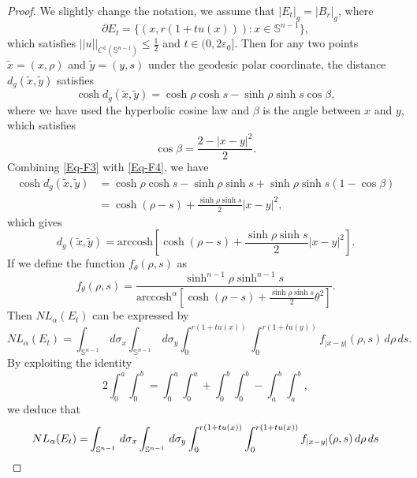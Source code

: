 \documentclass[10pt,a4paper]{amsart}
\begin{document}
\begin{proof}
	We slightly change the notation, we assume that $|E_t|_g=|B_r|_g$, where 
	\begin{equation*}
		\partial E_t=\{(x,r(1+tu(x))):x\in\mathbb{S}^{n-1}\},
\end{equation*}
which satisfies $||u||_{C^1(\mathbb{S}^{n-1})}\leq\frac{1}{2}$ and $t\in(0,2\varepsilon_0]$. Then for any two points $\tilde{x}=(x,\rho)$ and $\tilde{y}=(y,s)$ under the geodesic polar coordinate, the distance $d_g(\tilde{x},\tilde{y})$ satisfies
\begin{equation}\label{Eq-F3}
	\cosh d_g(\tilde{x},\tilde{y})=\cosh\rho\cosh s-\sinh\rho\sinh s\cos\beta,
\end{equation}
where we have used the hyperbolic cosine law and $\beta$ is the angle between $x$ and $y$,
which satisfies
\begin{equation}\label{Eq-F4}
	\cos\beta=\frac{2-|x-y|^2}{2}.
\end{equation}
Combining \eqref{Eq-F3} with \eqref{Eq-F4}, we have
\begin{align*}
	\cosh d_g(\tilde{x},\tilde{y})&=\cosh\rho\cosh s-\sinh\rho\sinh s+\sinh\rho\sinh s(1-\cos\beta)\\
	&=\cosh(\rho-s)+\frac{\sinh\rho\sinh s}{2}|x-y|^2,
\end{align*} 
which gives
\begin{equation*}
	d_g(\tilde{x},\tilde{y})=\mathrm{arccosh}\left[\cosh(\rho-s)+\frac{\sinh\rho\sinh s}{2}|x-y|^2\right].
\end{equation*}
If we define the function $f_{\theta}(\rho,s)$ as
\begin{equation}\label{Eq-F5}
	f_{\theta}(\rho,s)=\frac{\sinh^{n-1}\rho\sinh^{n-1}s}{\mathrm{arccosh}^{\alpha}\left[\cosh(\rho-s)+\frac{\sinh\rho\sinh s}{2}{\theta}^2\right]}.
\end{equation}
Then $NL_{\alpha}(E_t)$ can be expressed by 
\begin{equation}\label{Eq-F6}
	NL_{\alpha}(E_t)=\int_{\mathbb{S}^{n-1}}\,d\sigma_x\int_{\mathbb{S}^{n-1}}\,d\sigma_y\int_0^{r(1+tu(x))}\int_0^{r(1+tu(y))}{f_{|x-y|}(\rho,s)}\,d\rho\,ds.
\end{equation}
By exploiting the identity
\begin{equation*}
	2\int_0^a\int_0^b=\int_0^a\int_0^a+\int_0^b\int_0^b-\int_a^b\int_a^b,
\end{equation*}
we deduce that 
\begin{align}
	NL_{\alpha}(E_t)=&\int_{\mathbb{S}^{n-1}}\,d\sigma_x\int_{\mathbb{S}^{n-1}}\,d\sigma_y\int_0^{r(1+tu(x))}\int_0^{r(1+tu(x))}{f_{|x-y|}(\rho,s)}\,d\rho\,ds\notag\\

\end{align}
\end{proof}
\end{document}
